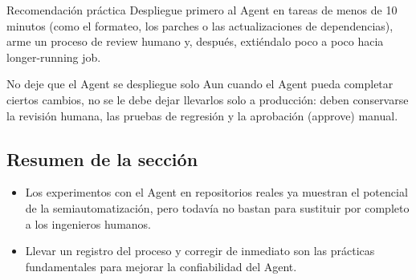 \begin{importantbox}{Recomendación práctica}
Despliegue primero al Agent en tareas de menos de 10 minutos (como el formateo, los parches o las actualizaciones de dependencias), arme un proceso de review humano y, después, extiéndalo poco a poco hacia longer-running job.
\end{importantbox}

\begin{warningbox}{No deje que el Agent se despliegue solo}
Aun cuando el Agent pueda completar ciertos cambios, no se le debe dejar llevarlos solo a producción: deben conservarse la revisión humana, las pruebas de regresión y la aprobación (approve) manual.
\end{warningbox}

\subsection{Resumen de la sección}
\begin{itemize}
    \item Los experimentos con el Agent en repositorios reales ya muestran el potencial de la semiautomatización, pero todavía no bastan para sustituir por completo a los ingenieros humanos.
    \item Llevar un registro del proceso y corregir de inmediato son las prácticas fundamentales para mejorar la confiabilidad del Agent.
\end{itemize}
